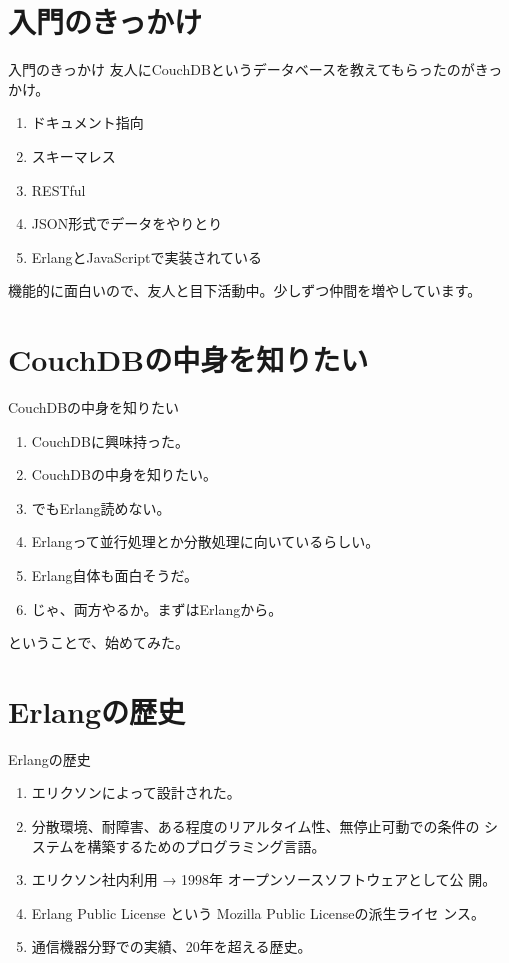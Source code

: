 \frame{\titlepage{}}

\section{入門のきっかけ}
\begin{frame}[containsverbatim]{入門のきっかけ}
友人にCouchDBというデータベースを教えてもらったのがきっかけ。

\begin{enumerate}
 \item ドキュメント指向
 \item スキーマレス
 \item RESTful
 \item JSON形式でデータをやりとり
 \item ErlangとJavaScriptで実装されている
\end{enumerate}
機能的に面白いので、友人と目下活動中。少しずつ仲間を増やしています。

\end{frame}

\section{CouchDBの中身を知りたい}
\begin{frame}[containsverbatim]{CouchDBの中身を知りたい}
 \begin{center}
  \begin{enumerate}
   \item CouchDBに興味持った。
   \item CouchDBの中身を知りたい。
   \item でもErlang読めない。
   \item Erlangって並行処理とか分散処理に向いているらしい。
   \item Erlang自体も面白そうだ。
   \item じゃ、両方やるか。まずはErlangから。
  \end{enumerate}
 \end{center}
ということで、始めてみた。
\end{frame}

\section{Erlangの歴史}
\begin{frame}{Erlangの歴史}

 \begin{enumerate}
  \item エリクソンによって設計された。
  \item 分散環境、耐障害、ある程度のリアルタイム性、無停止可動での条件の
	システムを構築するためのプログラミング言語。
  \item エリクソン社内利用 → 1998年 オープンソースソフトウェアとして公
	開。
  \item Erlang Public License という Mozilla Public Licenseの派生ライセ
	ンス。
  \item 通信機器分野での実績、20年を超える歴史。
 \end{enumerate}
\end{frame}

